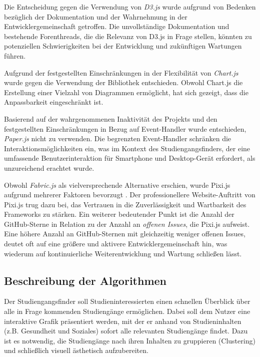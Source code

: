 Die Entscheidung gegen die Verwendung von \textit{D3.js} wurde aufgrund
von Bedenken bezüglich der Dokumentation und der Wahrnehmung in der 
Entwicklergemeinschaft getroffen. Die unvollständige Dokumentation und
bestehende Forenthreads, die die Relevanz von D3.js in Frage stellen, könnten zu
potenziellen Schwierigkeiten bei der Entwicklung und zukünftigen Wartungen
führen. \parencite{d3js}


Aufgrund der festgestellten Einschränkungen in der Flexibilität von
\textit{Chart.js} wurde gegen die Verwendung der Bibliothek entschieden. Obwohl
Chart.js die Erstellung einer Vielzahl von Diagrammen ermöglicht, hat sich
gezeigt, dass die Anpassbarkeit eingeschränkt ist. \parencite{chartjs}

Basierend auf der wahrgenommenen Inaktivität des Projekts und den festgestellten 
Einschränkungen in Bezug auf Event-Handler wurde entschieden, \textit{Paper.js}
nicht zu verwenden. \parencite{paperjs} Die begrenzten Event-Handler schränken
die Interaktionsmöglichkeiten ein, was im Kontext des Studiengangsfinders, der
eine umfassende Benutzerinteraktion für Smartphone und Desktop-Gerät erfordert,
als unzureichend erachtet wurde. \parencite{paperjs-events}

Obwohl \textit{Fabric.js} als vielversprechende Alternative erschien, wurde
Pixi.js aufgrund mehrerer Faktoren bevorzugt \parencite{fabricjs}. Der
professionellere Website-Auftritt von Pixi.js trug dazu bei, das Vertrauen in
die Zuverlässigkeit und Wartbarkeit des Frameworks zu stärken. Ein weiterer
bedeutender Punkt ist die Anzahl der GitHub-Sterne in Relation zu der Anzahl an
\textit{offenen Issues}, die Pixi.js aufweist. Eine höhere Anzahl an
GitHub-Sternen mit gleichzeitig weniger offenen Issues, deutet oft auf eine
größere und aktivere Entwicklergemeinschaft hin, was wiederum auf
kontinuierliche Weiterentwicklung und Wartung schließen lässt.
\parencite{paperjs-pixijs-comparison}


\subsection{Beschreibung der Algorithmen}
Der Studiengangsfinder soll Studieninteressierten einen schnellen Überblick über
alle in Frage kommenden Studiengänge ermöglichen.  Dabei soll dem Nutzer eine
interaktive Grafik präsentiert werden, mit der er anhand von Studieninhalten
(z.B. \glqq Gesundheit und Soziales\grqq{}) sofort alle relevanten Studiengänge
findet. Dazu ist es notwendig, die Studiengänge nach ihren Inhalten zu
gruppieren (Clustering) und schließlich visuell ästhetisch aufzubereiten.

